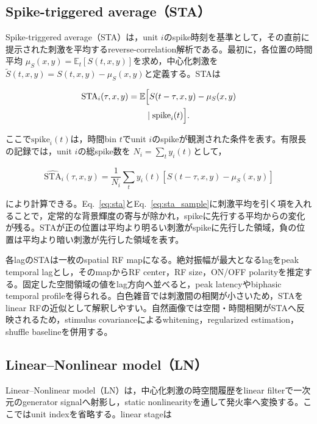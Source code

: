 \documentclass[uplatex,dvipdfmx,a4paper,10pt]{jsarticle}
\begin{document}
\subsection{Spike-triggered average（STA）}
\label{subsec:sta}

Spike-triggered average（STA）は，unit \(i\)のspike時刻を基準として，その直前に提示された刺激を平均するreverse-correlation解析である。最初に，各位置の時間平均
\(\mu_S(x,y)=\mathbb{E}_t[S(t,x,y)]\)を求め，中心化刺激を
\(\widetilde{S}(t,x,y)=S(t,x,y)-\mu_S(x,y)\)と定義する。STAは

\begin{equation}
\begin{aligned}
\mathrm{STA}_i(\tau,x,y)
&=
\mathbb{E}
\Bigl[
S(t-\tau,x,y)-\mu_S(x,y)
\\
&\qquad
\mid \mathrm{spike}_i(t)
\Bigr].
\end{aligned}
\label{eq:sta}
\end{equation}

ここで\(\mathrm{spike}_i(t)\)は，時間bin \(t\)でunit \(i\)のspikeが観測された条件を表す。有限長の記録では，unit \(i\)の総spike数を
\(N_i=\sum_t y_i(t)\)として，

\begin{equation}
\widehat{\mathrm{STA}}_i(\tau,x,y)
=
\frac{1}{N_i}
\sum_t
y_i(t)
\left[
S(t-\tau,x,y)-\mu_S(x,y)
\right]
\label{eq:sta_sample}
\end{equation}

により計算できる。Eq.~\eqref{eq:sta}とEq.~\eqref{eq:sta_sample}に刺激平均を引く項を入れることで，定常的な背景輝度の寄与が除かれ，spikeに先行する平均からの変化が残る。STAが正の位置は平均より明るい刺激がspikeに先行した領域，負の位置は平均より暗い刺激が先行した領域を表す。

各lagのSTAは一枚のspatial RF mapになる。絶対振幅が最大となるlagをpeak temporal lagとし，そのmapからRF center，RF size，ON/OFF polarityを推定する。固定した空間領域の値をlag方向へ並べると，peak latencyやbiphasic temporal profileを得られる。白色雑音では刺激間の相関が小さいため，STAをlinear RFの近似として解釈しやすい。自然画像では空間・時間相関がSTAへ反映されるため，stimulus covarianceによるwhitening，regularized estimation，shuffle baselineを併用する。

\subsection{Linear--Nonlinear model（LN）}
\label{subsec:ln}

Linear--Nonlinear model（LN）は，中心化刺激の時空間履歴をlinear filterで一次元のgenerator signalへ射影し，static nonlinearityを通して発火率へ変換する。ここではunit indexを省略する。linear stageは
\end{document}
